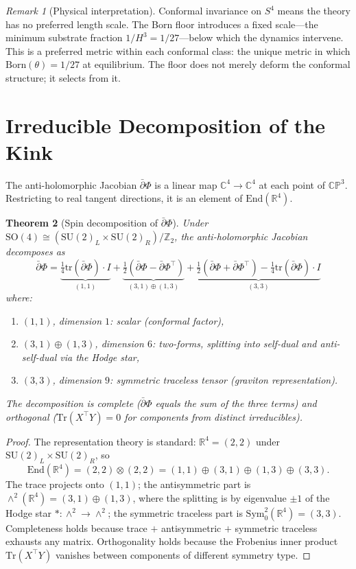 \documentclass[11pt,a4paper]{article}
\newtheorem{theorem}{Theorem}[section]
\theoremstyle{definition}
\theoremstyle{remark}
\newtheorem{remark}[theorem]{Remark}
\newcommand{\CP}{\mathbb{CP}}
\newcommand{\C}{\mathbb{C}}
\newcommand{\R}{\mathbb{R}}
\newcommand{\Z}{\mathbb{Z}}
\newcommand{\dbar}{\bar{\partial}}
\newcommand{\SU}{\mathrm{SU}}
\begin{document}
\begin{remark}[Physical interpretation]
Conformal invariance on $S^4$ means the theory has no preferred length scale. The Born floor introduces a fixed scale---the minimum substrate fraction $1/H^3=1/27$---below which the dynamics intervene. This is a preferred metric within each conformal class: the unique metric in which $\mathrm{Born}(\theta)=1/27$ at equilibrium. The floor does not merely deform the conformal structure; it selects from it.
\end{remark}


\section{Irreducible Decomposition of the Kink}\label{sec:kink_decomp}

The anti-holomorphic Jacobian $\dbar\Phi$ is a linear map $\C^4\to\C^4$ at each point of $\CP^3$. Restricting to real tangent directions, it is an element of $\mathrm{End}(\R^4)$.

\begin{theorem}[Spin decomposition of $\dbar\Phi$]\label{thm:spin_decomp}
Under $\mathrm{SO}(4)\cong(\SU(2)_L\times\SU(2)_R)/\Z_2$, the anti-holomorphic Jacobian decomposes as
\begin{equation}\label{eq:spin_decomp}
\dbar\Phi=\underbrace{\tfrac{1}{4}\mathrm{tr}(\dbar\Phi)\cdot I}_{(1,1)}+\underbrace{\tfrac{1}{2}(\dbar\Phi-\dbar\Phi^\top)}_{(3,1)\oplus(1,3)}+\underbrace{\tfrac{1}{2}(\dbar\Phi+\dbar\Phi^\top)-\tfrac{1}{4}\mathrm{tr}(\dbar\Phi)\cdot I}_{(3,3)}
\end{equation}
where:
\begin{enumerate}[nosep]
\item $(1,1)$, dimension $1$: scalar (conformal factor),
\item $(3,1)\oplus(1,3)$, dimension $6$: two-forms, splitting into self-dual and anti-self-dual via the Hodge star,
\item $(3,3)$, dimension $9$: symmetric traceless tensor (graviton representation).
\end{enumerate}
The decomposition is complete ($\dbar\Phi$ equals the sum of the three terms) and orthogonal ($\mathrm{Tr}(X^\top Y)=0$ for components from distinct irreducibles).
\end{theorem}

\begin{proof}
The representation theory is standard: $\R^4=(2,2)$ under $\SU(2)_L\times\SU(2)_R$, so
\[
\mathrm{End}(\R^4)=(2,2)\otimes(2,2)=(1,1)\oplus(3,1)\oplus(1,3)\oplus(3,3).
\]
The trace projects onto $(1,1)$; the antisymmetric part is $\wedge^2(\R^4)=(3,1)\oplus(1,3)$, where the splitting is by eigenvalue $\pm 1$ of the Hodge star $\ast:\wedge^2\to\wedge^2$; the symmetric traceless part is $\mathrm{Sym}^2_0(\R^4)=(3,3)$. Completeness holds because trace $+$ antisymmetric $+$ symmetric traceless exhausts any matrix. Orthogonality holds because the Frobenius inner product $\mathrm{Tr}(X^\top Y)$ vanishes between components of different symmetry type.
\end{proof}
\end{document}
